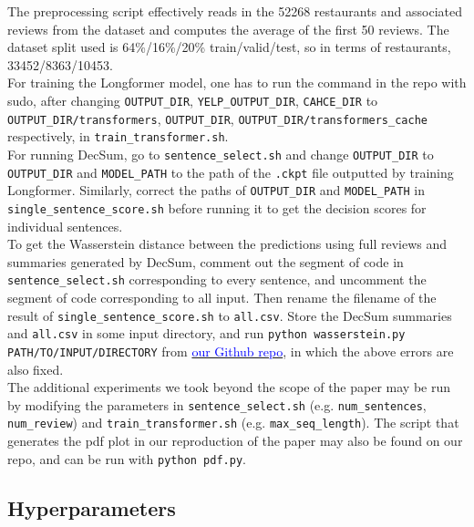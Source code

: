 \documentclass{article}
\newcommand{\blue}[1]{\textcolor{blue}{#1}}
\begin{document}
The preprocessing script effectively reads in the 52268 restaurants and associated reviews from the dataset and computes the average of the first 50 reviews. The dataset split used is
64\%/16\%/20\% train/valid/test, so in terms of restaurants, 33452/8363/10453. \\

For training the Longformer model, one has to run the command in the repo with sudo, after changing \texttt{OUTPUT\_DIR}, \texttt{YELP\_OUTPUT\_DIR}, \texttt{CAHCE\_DIR} to
\texttt{OUTPUT\_DIR/transformers}, \texttt{OUTPUT\_DIR}, \texttt{OUTPUT\_DIR/transformers\_cache} respectively, in \texttt{train\_transformer.sh}. \\

For running DecSum, go to \texttt{sentence\_select.sh} and change \texttt{OUTPUT\_DIR} to \texttt{OUTPUT\_DIR} and \texttt{MODEL\_PATH} to the path of the \texttt{.ckpt} file outputted by
training Longformer. Similarly,
correct the paths of \texttt{OUTPUT\_DIR} and \texttt{MODEL\_PATH} in \texttt{single\_sentence\_score.sh} before running it to get the decision scores for individual sentences. \\

To get the Wasserstein distance between the predictions using full reviews and summaries generated by DecSum, comment out the segment of code in \texttt{sentence\_select.sh} corresponding to every
sentence, and uncomment the segment of code corresponding to all input. Then rename the filename of the result of \texttt{single\_sentence\_score.sh} to
\texttt{all.csv}. Store the DecSum summaries and \texttt{all.csv} in some input directory, and run \texttt{python wasserstein.py PATH/TO/INPUT/DIRECTORY} from
\href{https://github.com/ericxiaseattle/CSE517-Project}{\blue{our Github repo}}, in which the above errors are also fixed. \\

The additional experiments we took beyond the scope of the paper may be run by modifying the parameters in \texttt{sentence\_select.sh} (e.g. \texttt{num\_sentences}, \texttt{num\_review}) and
\texttt{train\_transformer.sh} (e.g. \texttt{max\_seq\_length}). The script that generates the pdf plot in our reproduction of the paper may also be found on our repo, and can be run with
\texttt{python pdf.py}.

\subsection{Hyperparameters}
\end{document}

